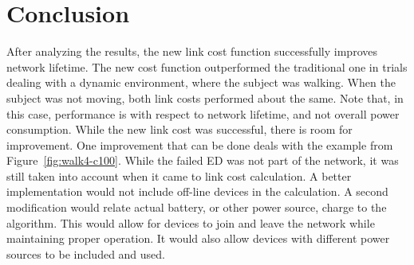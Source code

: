 \documentclass{article}
\begin{document}
\section{Conclusion}
After analyzing the results, the new link cost function successfully improves network lifetime. The new cost function outperformed the traditional one in trials dealing with a dynamic environment, where the subject was walking. When the subject was not moving, both link costs performed about the same. Note that, in this case, performance is with respect to network lifetime, and not overall power consumption.
While the new link cost was successful, there is room for improvement. One improvement that can be done deals with the example from Figure~\ref{fig:walk4-c100}. While the failed ED was not part of the network, it was still taken into account when it came to link cost calculation. A better implementation would not include off-line devices in the calculation. A second modification would relate actual battery, or other power source, charge to the algorithm. This would allow for devices to join and leave the network while maintaining proper operation. It would also allow devices with different power sources to be included and used.

{}

\end{document}
